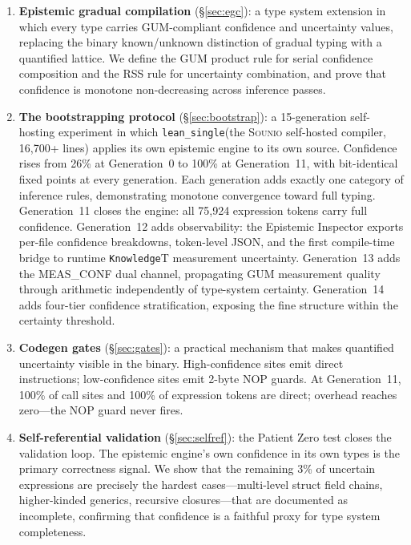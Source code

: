 \documentclass[acmsmall,screen,review,anonymous]{acmart}
\newcommand{\sounio}{\textsc{Sounio}\xspace}
\newcommand{\lean}{\texttt{lean\_single}\xspace}
\newcommand{\know}[1]{\texttt{Knowledge}\langle #1 \rangle}
\begin{document}
\begin{enumerate}

\item \textbf{Epistemic gradual compilation} (\S\ref{sec:egc}): a type
  system extension in which every type carries GUM-compliant confidence
  and uncertainty values, replacing the binary known/unknown distinction
  of gradual typing with a quantified lattice.
  We define the GUM product rule for serial confidence composition and the
  RSS rule for uncertainty combination, and prove that confidence is
  monotone non-decreasing across inference passes.

\item \textbf{The bootstrapping protocol} (\S\ref{sec:bootstrap}):
  a 15-generation self-hosting experiment in which \lean (the \sounio
  self-hosted compiler, 16,700+ lines) applies its own epistemic engine
  to its own source.
  Confidence rises from 26\% at Generation~0 to 100\% at Generation~11,
  with bit-identical fixed points at every generation.
  Each generation adds exactly one category of inference rules,
  demonstrating monotone convergence toward full typing.
  Generation~11 closes the engine: all 75,924 expression tokens
  carry full confidence.
  Generation~12 adds observability: the Epistemic Inspector exports
  per-file confidence breakdowns, token-level JSON, and the first
  compile-time bridge to runtime \know{T} measurement uncertainty.
  Generation~13 adds the MEAS\_CONF dual channel, propagating GUM
  measurement quality through arithmetic independently of type-system certainty.
  Generation~14 adds four-tier confidence stratification, exposing the
  fine structure within the certainty threshold.

\item \textbf{Codegen gates} (\S\ref{sec:gates}): a practical
  mechanism that makes quantified uncertainty visible in the binary.
  High-confidence sites emit direct instructions; low-confidence
  sites emit 2-byte NOP guards.
  At Generation~11, 100\% of call sites and 100\% of expression tokens
  are direct; overhead reaches zero---the NOP guard never fires.

\item \textbf{Self-referential validation} (\S\ref{sec:selfref}):
  the Patient Zero test closes the validation loop.
  The epistemic engine's own confidence in its own types is the primary
  correctness signal.
  We show that the remaining 3\% of uncertain expressions are precisely
  the hardest cases---multi-level struct field chains, higher-kinded
  generics, recursive closures---that are documented as incomplete,
  confirming that confidence is a faithful proxy for type system
  completeness.

\end{enumerate}
\end{document}
